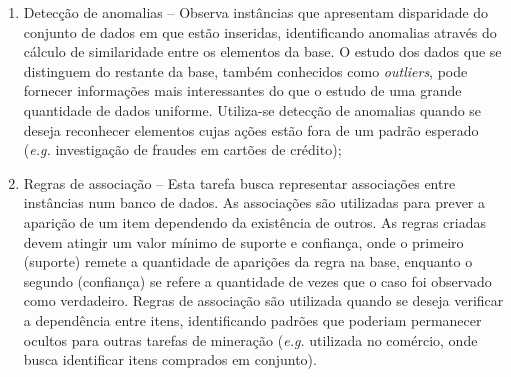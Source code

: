 \begin{enumerate}[label=\roman*.]
    \item Detecção de anomalias {--} Observa instâncias que apresentam disparidade do conjunto de dados em que estão inseridas, identificando anomalias através do cálculo de similaridade entre os elementos da base. O estudo dos dados que se distinguem do restante da base, também conhecidos como \textit{outliers}, pode fornecer informações mais interessantes do que o estudo de uma grande quantidade de dados uniforme. Utiliza\hyp{}se detecção de anomalias quando se deseja reconhecer elementos cujas ações estão fora de um padrão esperado (\textit{e.g.} investigação de fraudes em cartões de crédito);
    \item Regras de associação {--} Esta tarefa busca representar associações entre instâncias num banco de dados. As associações são utilizadas para prever a aparição de um item dependendo da existência de outros. As regras criadas devem atingir um valor mínimo de suporte e confiança, onde o primeiro (suporte) remete a quantidade de aparições da regra na base, enquanto o segundo (confiança) se refere a quantidade de vezes que o caso foi observado como verdadeiro. Regras de associação são utilizada quando se deseja verificar a dependência entre itens, identificando padrões que poderiam permanecer ocultos para outras tarefas de mineração (\textit{e.g.} utilizada no comércio, onde busca identificar itens comprados em conjunto).
\end{enumerate}